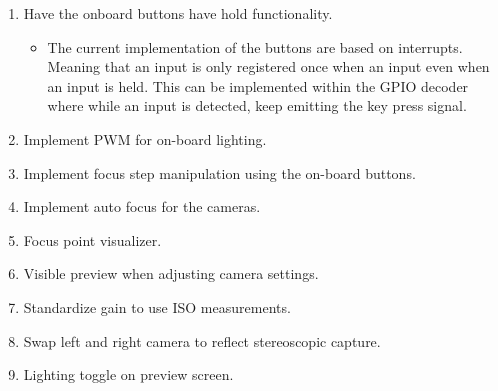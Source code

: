 \begin{enumerate}
\begin{itemize}
          \end{itemize}
	\item Have the onboard buttons have hold functionality.
          \begin{itemize}
            \item The current implementation of the buttons are based on interrupts. Meaning that an input is only registered once when an input even when an input is held. This can be implemented within the GPIO decoder where while an input is detected, keep emitting the key press signal.
          \end{itemize}
	\item Implement PWM for on-board lighting.
	\item Implement focus step manipulation using the on-board buttons.
	\item Implement auto focus for the cameras.
	\item Focus point visualizer.
	\item Visible preview when adjusting camera settings.
	\item Standardize gain to use ISO measurements.
	\item Swap left and right camera to reflect stereoscopic capture.
	\item Lighting toggle on preview screen.
\end{enumerate}